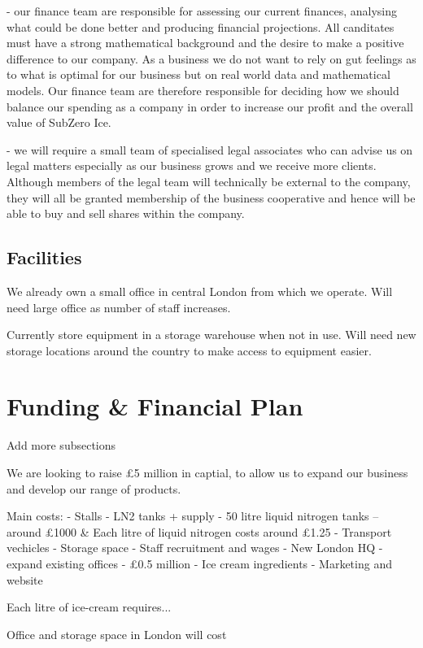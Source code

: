 \documentclass{article}
\begin{document}
  - our finance team are responsible for assessing our current finances, analysing what could be done better and producing financial projections. All canditates must have a strong mathematical background and the desire to make a positive difference to our company. As a business we do not want to rely on gut feelings as to what is optimal for our business but on real world data and mathematical models. Our finance team are therefore responsible for deciding how we should balance our spending as a company in order to increase our profit and the overall value of SubZero Ice.

  - we will require a small team of specialised legal associates who can advise us on legal matters especially as our business grows and we receive more clients. Although members of the legal team will technically be external to the company, they will all be granted membership of the business cooperative and hence will be able to buy and sell shares within the company.


  \subsection{Facilities}

  We already own a small office in central London from which we operate.
  Will need large office as number of staff increases.

  Currently store equipment in a storage warehouse when not in use.
  Will need new storage locations around the country to make access to equipment easier.


\section{Funding \& Financial Plan}
Add more subsections

We are looking to raise £5 million in captial, to allow us to expand our business and develop our range of products.

Main costs:
 - Stalls - LN2 tanks + supply - 50 litre liquid nitrogen tanks – around £1000 & Each litre of liquid nitrogen costs around £1.25
 - Transport vechicles
 - Storage space
 - Staff recruitment and wages
 - New London HQ - expand existing offices - £0.5 million
 - Ice cream ingredients
 - Marketing and website




Each litre of ice-cream requires...

Office and storage space in London will cost
\end{document}
